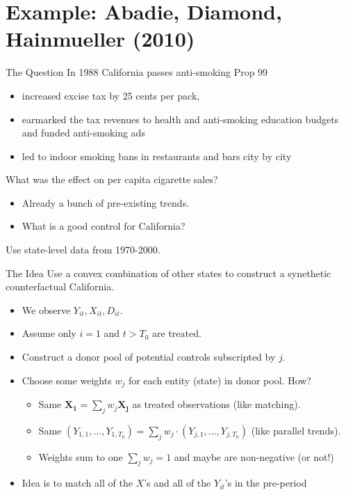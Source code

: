 \documentclass[aspectratio=169,11pt]{beamer}
\begin{document}
\section{Example: Abadie, Diamond, Hainmueller (2010)}

\begin{frame}{The Question}
In 1988 California passes anti-smoking Prop 99
\begin{itemize}
\item increased excise tax by 25 cents per pack, 
\item earmarked the tax revenues to health and anti-smoking education budgets and funded anti-smoking ads
\item led to indoor smoking bans in restaurants and bars city by city
\end{itemize}
 What was the effect on per capita cigarette sales?
 \begin{itemize}
 \item Already a bunch of pre-existing trends.
 \item What is a good control for California?
 \end{itemize}
 Use state-level data from 1970-2000.
\end{frame}

\begin{frame}{The Idea}
Use a convex combination of other states to construct a \alert{synethetic counterfactual California}.\\
\begin{itemize}
\item We observe $Y_{it}, X_{it}, D_{it}$.
\item Assume only $i=1$ and $t > T_0$ are \alert{treated}.
\item Construct a \alert{donor pool} of potential controls subscripted by $j$.
\item Choose some \alert{weights} $w_j$ for each entity (state) in donor pool. How?
\begin{itemize}
\item Same $\mathbf{X_{1}} = \sum_j w_j \mathbf{X_{j}}$ as treated observations (like matching).
\item Same $\left({Y_{1,1},\ldots, Y_{1, T_0}} \right)= \sum_j w_j \cdot \left({Y_{j,1},\ldots, Y_{j,T_0}} \right)$ (like parallel trends).
\item Weights sum to one $\sum_j w_j = 1$ and maybe are non-negative (or not!)
\end{itemize}
\item Idea is to match all of the $X$'s and all of the $Y_{it}$'s in the \alert{pre-period}
\end{itemize}
\end{frame}
\end{document}
